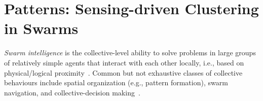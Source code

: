 \newcommand{\LP}[2]{\marginpar{$\color{red}\star$}\color{gray}\sout{#1}\color{blue}\
  #2 \color{black}}
\newcommand{\LPr}[2]{{\color{gray}\ #1\ \color{orange}\  #2}}


\chapter[Patterns: Sensing-driven Clustering in Swarms]{Patterns: Sensing-driven Clustering in Swarms}\label{chap:eng:clustering}\mtcaddchapter
\minitoc%

\emph{Swarm intelligence}
 is the collective-level ability to solve problems
 in large groups of relatively simple agents that interact with each other locally, i.e., based on physical/logical proximity~\cite{DBLP:books/daglib/0032898}.
%
Common but not exhaustive classes of collective behaviours
 include spatial organization (e.g., pattern formation),
 swarm navigation,
 and collective-decision making~\cite{DBLP:journals/swarm/BrambillaFBD13}.
%

